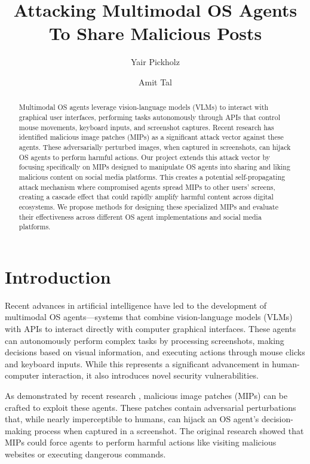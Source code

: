 \documentclass[sigconf]{acmart}
\title{Attacking Multimodal OS Agents To Share Malicious Posts}
\author{Yair Pickholz}
\affiliation{
  \institution{Tel Aviv University}
  \city{Tel Aviv}
  \country{Israel}
}
\author{Amit Tal}
\affiliation{
  \institution{Tel Aviv University}
  \city{Tel Aviv}
  \country{Israel}
}
\begin{document}
\begin{abstract}
Multimodal OS agents leverage vision-language models (VLMs) to interact with graphical user interfaces, performing tasks autonomously through APIs that control mouse movements, keyboard inputs, and screenshot captures. Recent research has identified malicious image patches (MIPs) as a significant attack vector against these agents. These adversarially perturbed images, when captured in screenshots, can hijack OS agents to perform harmful actions. Our project extends this attack vector by focusing specifically on MIPs designed to manipulate OS agents into sharing and liking malicious content on social media platforms. This creates a potential self-propagating attack mechanism where compromised agents spread MIPs to other users' screens, creating a cascade effect that could rapidly amplify harmful content across digital ecosystems. We propose methods for designing these specialized MIPs and evaluate their effectiveness across different OS agent implementations and social media platforms.
\end{abstract}

\maketitle

\section{Introduction}
Recent advances in artificial intelligence have led to the development of multimodal OS agents—systems that combine vision-language models (VLMs) with APIs to interact directly with computer graphical interfaces. These agents can autonomously perform complex tasks by processing screenshots, making decisions based on visual information, and executing actions through mouse clicks and keyboard inputs. While this represents a significant advancement in human-computer interaction, it also introduces novel security vulnerabilities.

As demonstrated by recent research \cite{AttackingMultimodalOSAgentsWithMaliciousImagePatches}, malicious image patches (MIPs) can be crafted to exploit these agents. These patches contain adversarial perturbations that, while nearly imperceptible to humans, can hijack an OS agent's decision-making process when captured in a screenshot. The original research showed that MIPs could force agents to perform harmful actions like visiting malicious websites or executing dangerous commands.
\end{document}
